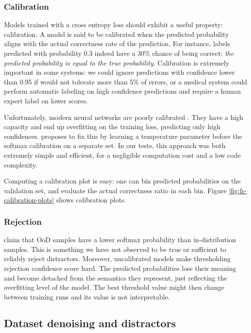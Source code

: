\subsubsection{Calibration}
\label{sec:calibration}

Models trained with a cross entropy loss should exhibit a useful property: calibration. A model is said to be calibrated when the predicted probability  aligns with the actual correctness rate of the prediction. For instance, labels predicted with probability 0.3 indeed have a 30\% chance of being correct: \emph{the predicted probability is equal to the true probability}. Calibration is extremely important in some systems: we could ignore predictions with confidence lower than 0.95 if would not tolerate more than 5\% of errors, or a medical system could perform automatic labeling on high confidence predictions and require a human expert label on lower scores.

Unfortunately, modern neural networks are poorly calibrated \cite{calibration}. They have a high capacity and end up overfitting on the training loss, predicting only high confidences. \citet{calibration} proposes to fix this by learning a temperature parameter before the softmax calibration on a separate set. In our tests, this approach was both extremely simple and efficient, for a negligible computation cost and a low code complexity.

Computing a calibration plot is easy: one can bin predicted probabilities on the validation set, and evaluate the actual correctness ratio in each bin. Figure \ref{fig:fr-calibration-plots} shows calibration plots.

\subsubsection{Rejection}

\citet{softmaxood} claim that \ac{OoD} samples have a lower softmax probability than in-distribution samples. This is something we have not observed to be true or sufficient to reliably reject distractors. Moreover, uncalibrated models make thresholding rejection confidence score hard. The predicted probabilities lose their meaning and become detached from the semantics they represent, just reflecting the overfitting level of the model. The best threshold value might then change between training runs and its value is not interpretable.

\subsection{Dataset denoising and distractors}


